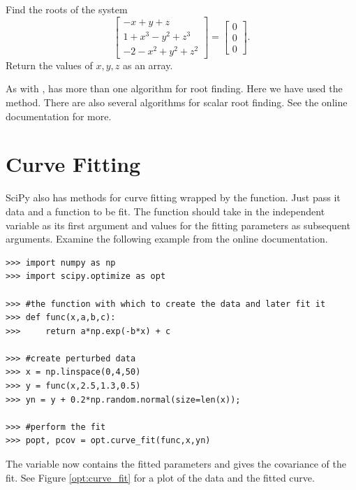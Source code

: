 \begin{problem}
Find the roots of the system
\[
\begin{bmatrix}
	-x+y+z \\
	1+x^3-y^2+z^3\\
	-2-x^2+y^2+z^2
\end{bmatrix} =
\begin{bmatrix}
	0 \\
	0 \\
	0
\end{bmatrix} .
\]
Return the values of $x,y,z$ as an array.
\end{problem}



As with ,  has more than one algorithm for root finding.
Here we have used the  method. There are also several algorithms for scalar root finding. See the online documentation for more.

\section*{Curve Fitting}


SciPy also has methods for curve fitting wrapped by the  function.
Just pass it data and a function to be fit. The function should take in the independent variable as its first argument and
values for the fitting parameters as subsequent arguments.
Examine the following example from the online documentation.
\begin{lstlisting}
>>> import numpy as np
>>> import scipy.optimize as opt

>>> #the function with which to create the data and later fit it
>>> def func(x,a,b,c):
>>>     return a*np.exp(-b*x) + c

>>> #create perturbed data
>>> x = np.linspace(0,4,50)
>>> y = func(x,2.5,1.3,0.5)
>>> yn = y + 0.2*np.random.normal(size=len(x));

>>> #perform the fit
>>> popt, pcov = opt.curve_fit(func,x,yn)
\end{lstlisting}
The variable  now contains the fitted parameters and  gives the covariance of the fit.
See Figure \ref{opt:curve_fit} for a plot of the data and the fitted curve.


